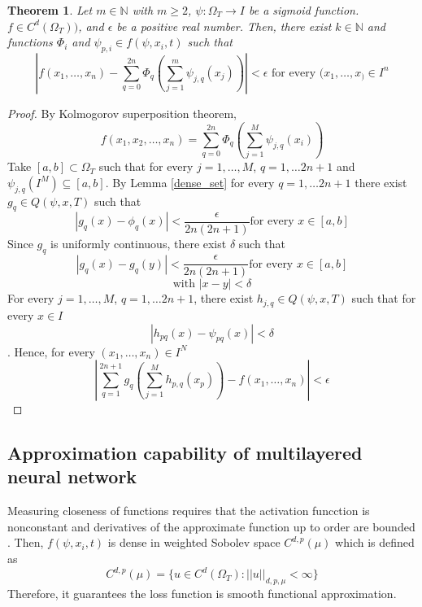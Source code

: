 \documentclass{article}
\newtheorem{theorem}{Theorem}[section]
\begin{document}
\begin{theorem}  \label{nn_proof}
	Let $m \in \mathbb{N}$ with $m \geq 2$, $\psi: \Omega_{T} \rightarrow \textit{I}$ be a sigmoid function. $f \in C^{d}(\Omega_{T}))$, and $\epsilon$ be a positive real number. Then, there exist $k \in \mathbb{N}$ and functions $\Phi_{i}$ and $\psi_{p,i} \in f(\psi,x_i,t)$ such that
	\begin{equation}
	\left|f(x_1,\dots,x_n)-\sum_{q=0}^{2n}\Phi_{q}\left(\sum_{j=1}^{m}\psi_{j,q}(x_j)\right)\right| < \epsilon \text{ for every } (x_1, \dots, x_) \in I^{n}
	\end{equation}
\end{theorem}
\begin{proof}
	By Kolmogorov superposition theorem,
	\[f(x_1,x_2, \dots, x_n)=\sum_{q=0}^{2n}\Phi_{q}\left(\sum_{j=1}^{M}\psi_{j,q}(x_i)\right)\]
	Take $[a,b] \subset \Omega_{T}$ such that for every $j=1,\dots,M$, $q=1, \dots 2n+1$ and $\psi_{j,q}(\textit{I}^{M})\subseteq [a,b]$. By Lemma \ref{dense_set} for every $q = 1, \dots 2n+1$ there exist $g_{q} \in Q(\psi,x,T)$ such that
	\[\left|g_{q}(x)-\phi_{q}(x)\right|<\frac{\epsilon}{2n(2n+1)} \text{for every } x \in [a,b]\]
	Since $g_{q}$ is uniformly continuous, there exist $\delta$ such that
	\[\left|g_{q}(x)-g_{q}(y)\right| <\frac{\epsilon}{2n(2n+1)} \text{for every } x \in [a,b]\]
	\[\text{with } \left|x-y\right|<\delta \]
	For every $j=1,\dots,M$, $q=1, \dots 2n+1$, there exist $h_{j,q} \in Q(\psi,x,T)$ such that for every $x \in \textit{I}$
	\[\left|h_{pq}(x)-\psi_{pq}(x)\right|<\delta \]. Hence, for every $(x_1, \dots , x_n)\in \textit{I}^{N}$
	\[	\left|\sum_{q=1}^{2n+1}g_{q}\left(\sum_{j=1}^{M}h_{p,q}(x_p)\right)-f(x_1,\dots,x_n)\right| < \epsilon\]
\end{proof}
\subsection{Approximation capability of multilayered neural network}


Measuring closeness of functions requires that the activation funcction is nonconstant and derivatives of the approximate function up to order are bounded \cite{hornik}. Then, $f(\psi,x_i,t)$ is dense in weighted Sobolev space $C^{d,p}(\mu)$ which is defined as \cite{hornik}
\begin{equation}
C^{d,p}(\mu) = \{ u \in C^{d}(\Omega_{T}): ||u||_{d,p,\mu} < \infty \}
\end{equation}
Therefore, it guarantees the loss function is smooth functional approximation.
\end{document}
